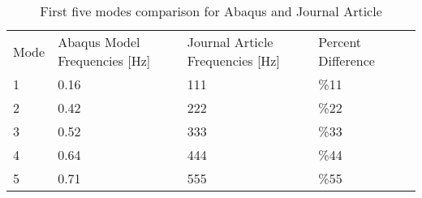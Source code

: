 \begin{table}
\begin{tabular}{lllll}
Mode & Abaqus Model Frequencies [Hz] & Journal Article Frequencies [Hz] & Percent Difference &  \\
1    & 0.16                          & 111                              & \%11               &  \\
2    & 0.42                          & 222                              & \%22               &  \\
3    & 0.52                          & 333                              & \%33               &  \\
4    & 0.64                          & 444                              & \%44               &  \\
5    & 0.71                          & 555                              & \%55               &  \\
\end{tabular}
\caption{First five modes comparison for Abaqus and Journal Article}
\label{tab:FirstFive}
\end{table}
